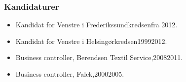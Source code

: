 \documentclass[11pt, a4paper]{awesome-cv}
\begin{document}
\begin{cvletter}
\subsubsection*{Kandidaturer}
\begin{itemize}
\item Kandidat for Venstre i Frederikssundkredsenfra 2012.
\item Kandidat for Venstre i Helsingørkredsen19992012.
\end{itemize}
\begin{itemize}
\item Business controller, Berendsen Textil Service,20082011.
\item Business controller, Falck,20002005.
\end{itemize}
\end{cvletter}
\end{document}
